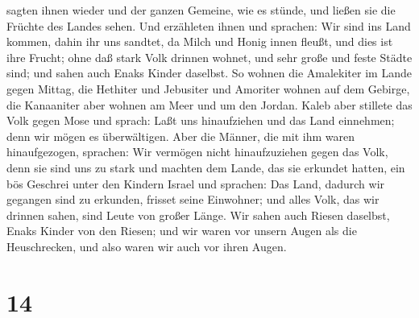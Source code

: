 sagten ihnen wieder und der ganzen Gemeine, wie es stünde, und ließen
sie die Früchte des Landes sehen.  Und erzähleten ihnen und
sprachen: Wir sind ins Land kommen, dahin ihr uns sandtet, da Milch und
Honig innen fleußt, und dies ist ihre Frucht;  ohne daß
stark Volk drinnen wohnet, und sehr große und feste Städte sind; und
sahen auch Enaks Kinder daselbst.  So wohnen die Amalekiter
im Lande gegen Mittag, die Hethiter und Jebusiter und Amoriter wohnen
auf dem Gebirge, die Kanaaniter aber wohnen am Meer und um den Jordan.
 Kaleb aber stillete das Volk gegen Mose und sprach: Laßt
uns hinaufziehen und das Land einnehmen; denn wir mögen es überwältigen.
 Aber die Männer, die mit ihm waren hinaufgezogen,
sprachen: Wir vermögen nicht hinaufzuziehen gegen das Volk, denn sie
sind uns zu stark  und machten dem Lande, das sie erkundet
hatten, ein bös Geschrei unter den Kindern Israel und sprachen: Das
Land, dadurch wir gegangen sind zu erkunden, frisset seine Einwohner;
und alles Volk, das wir drinnen sahen, sind Leute von großer Länge.
 Wir sahen auch Riesen daselbst, Enaks Kinder von den
Riesen; und wir waren vor unsern Augen als die Heuschrecken, und also
waren wir auch vor ihren Augen.

\hypertarget{section-13}{%
\section{14}\label{section-13}}

